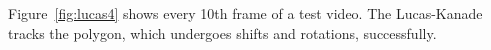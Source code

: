\documentclass[12pt,a4paper,oneside,openright]{book}
\newcommand{\fig}[1]{Figure~\ref{fig:#1}}
\begin{document}
\begin{CJK}{UTF8}{}
\fig{lucas4} shows every 10th frame of a test video. The Lucas-Kanade tracks the polygon, which undergoes shifts and rotations, successfully.
\begin{figure}[htbp]
  \begin{center}

\end{center}
\end{figure}
\end{CJK}
\end{document}
